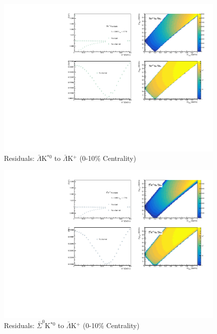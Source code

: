 \documentclass[../AnalysisNoteJBuxton.tex]{subfiles}
\begin{document}
\begin{figure}[h]
  \centering
  \includegraphics[width=\textwidth]{9_AdditionalFigures/Figures/Residuals/ALamKchP/Residuals_ALamKchP_0010_ALamKSt0_MomResCrctn_NonFlatBgdCrctn_10Res_PrimMaxDecay4fm_UsingXiDataAndCoulombOnly.pdf}
  \caption[Residuals: $\bar{\Lambda}$K$^{*0}$ to $\bar{\Lambda}$K$^{+}$ (0-10\% Centrality)]{Residuals: $\bar{\Lambda}$K$^{*0}$ to $\bar{\Lambda}$K$^{+}$ (0-10\% Centrality)}
  \label{fig:Res_ALamKchP_0010_ALamKSt0}
\end{figure}


\begin{figure}[h]
  \centering
  \includegraphics[width=\textwidth]{9_AdditionalFigures/Figures/Residuals/ALamKchP/Residuals_ALamKchP_0010_ASig0KSt0_MomResCrctn_NonFlatBgdCrctn_10Res_PrimMaxDecay4fm_UsingXiDataAndCoulombOnly.pdf}
  \caption[Residuals: $\bar{\Sigma}^{0}$K$^{*0}$ to $\bar{\Lambda}$K$^{+}$ (0-10\% Centrality)]{Residuals: $\bar{\Sigma}^{0}$K$^{*0}$ to $\bar{\Lambda}$K$^{+}$ (0-10\% Centrality)}
  \label{fig:Res_ALamKchP_0010_ASig0KSt0}
\end{figure}
\end{document}
